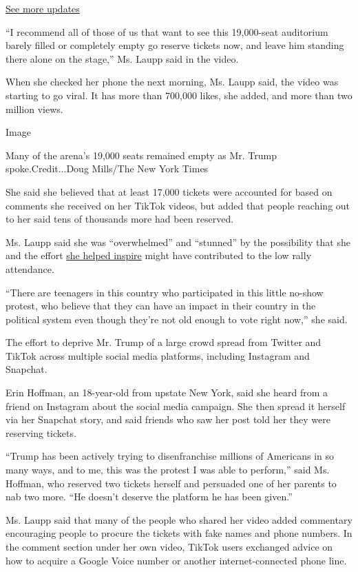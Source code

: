\href{https://www.nytimes3xbfgragh.onion/2020/08/04/us/elections/primary-election-michigan-arizona-kansas.html?action=click\&pgtype=Article\&state=default\&region=MAIN_CONTENT_1\&context=storylines_live_updates}{See
more updates}

``I recommend all of those of us that want to see this 19,000-seat
auditorium barely filled or completely empty go reserve tickets now, and
leave him standing there alone on the stage,'' Ms. Laupp said in the
video.

When she checked her phone the next morning, Ms. Laupp said, the video
was starting to go viral. It has more than 700,000 likes, she added, and
more than two million views.

Image

Many of the arena's 19,000 seats remained empty as Mr. Trump
spoke.Credit...Doug Mills/The New York Times

She said she believed that at least 17,000 tickets were accounted for
based on comments she received on her TikTok videos, but added that
people reaching out to her said tens of thousands more had been
reserved.

Ms. Laupp said she was ``overwhelmed'' and ``stunned'' by the
possibility that she and the effort
\href{https://www.tiktok.com/@maryjolaupp/video/6840619115585998085}{she
helped inspire} might have contributed to the low rally attendance.

``There are teenagers in this country who participated in this little
no-show protest, who believe that they can have an impact in their
country in the political system even though they're not old enough to
vote right now,'' she said.

The effort to deprive Mr. Trump of a large crowd spread from Twitter and
TikTok across multiple social media platforms, including Instagram and
Snapchat.

Erin Hoffman, an 18-year-old from upstate New York, said she heard from
a friend on Instagram about the social media campaign. She then spread
it herself via her Snapchat story, and said friends who saw her post
told her they were reserving tickets.

``Trump has been actively trying to disenfranchise millions of Americans
in so many ways, and to me, this was the protest I was able to
perform,'' said Ms. Hoffman, who reserved two tickets herself and
persuaded one of her parents to nab two more. ``He doesn't deserve the
platform he has been given.''

Ms. Laupp said that many of the people who shared her video added
commentary encouraging people to procure the tickets with fake names and
phone numbers. In the comment section under her own video, TikTok users
exchanged advice on how to acquire a Google Voice number or another
internet-connected phone line.

